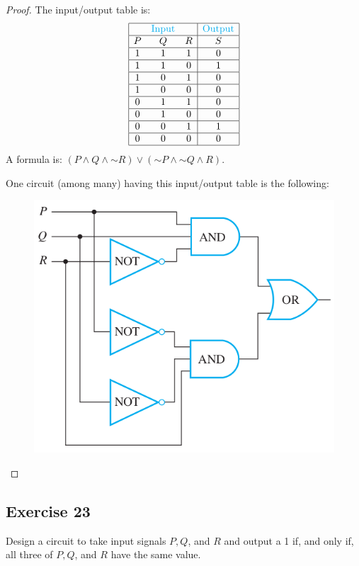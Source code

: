 \documentclass[14pt]{extarticle}
\begin{document}
\begin{proof} 
The input/output table is:
$$ 
\begin{array}{|ccc|c|} 
\hline 
& \color{cyan}\text{Input} & & \color{cyan}\text{Output} \\ \hline 
P&Q&R&S\\ 
\hline 
1&1&1&0\\ 
\hline 
1&1&0&1\\
\hline 
1&0&1&0\\ 
\hline 
1&0&0&0\\ 
\hline 
0&1&1&0\\ 
\hline 
0&1&0&0\\ 
\hline
0&0&1&1\\ 
\hline 
0&0&0&0\\ 
\hline 
\end{array} 
$$
A formula is: $(P \wedge Q \wedge {\sim R}) \vee ({\sim P} \wedge {\sim Q} \wedge R)$.

One circuit (among many) having this input/output table is the following:

\begin{figure}[ht!] 
\centering 
\includegraphics[scale=0.5]{../images/2.4.22.png}
\end{figure} 
\end{proof}

\subsection{Exercise 23} 
Design a circuit to take input signals $P, Q$, and $R$ and output a 1 if, and only if, all three of $P, Q$, and $R$ have the same value.
\end{document}
